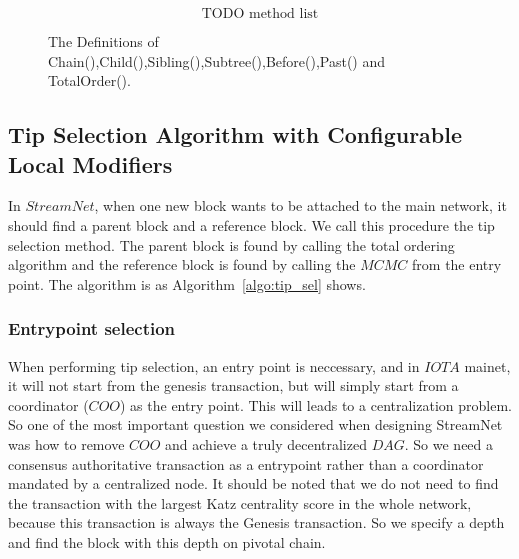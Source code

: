 

\begin{figure}
\begin{equation*}
  \text{ TODO method list }
\end{equation*}
\label{totalFormulas}
\caption{ The Definitions of Chain(),Child(),Sibling(),Subtree(),Before(),Past() and TotalOrder(). }
\end{figure}

\subsection{Tip Selection Algorithm with Configurable Local Modifiers}

In $StreamNet$, when one new block wants to be attached to the main network, it should find a parent block and a reference block. We call this procedure the tip selection method. 
The parent block is found by calling the total ordering algorithm and the reference block is found by calling the $MCMC$ from the entry point. The algorithm is as Algorithm~\ref{algo:tip_sel} shows.



\subsubsection{Entrypoint selection}
When performing tip selection, an entry point is neccessary, and in $IOTA$ mainet, it will not start from the genesis transaction,
but will simply start from a coordinator ($COO$) as the entry point.
This will leads to a centralization problem. 
So one of the most important question we considered when designing StreamNet was how to remove $COO$ and achieve a truly decentralized $DAG$. 
So we need a consensus authoritative transaction as a entrypoint rather than a coordinator mandated by a centralized node.
It should be noted that we do not need to find the transaction with the largest Katz centrality score in the whole network,
because this transaction is always the Genesis transaction.
So we specify a depth and find the block with this depth on pivotal chain.


